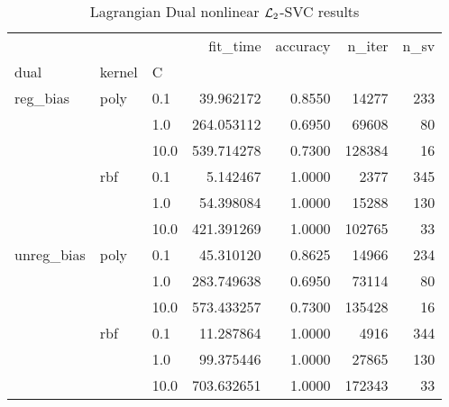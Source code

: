 \begin{table}[H]
\centering
\caption{Lagrangian Dual nonlinear $\protect \mathcal{L}_2$-SVC results}
\label{nonlinear_lagrangian_dual_l2_svc_cv_results}
\begin{tabular}{lllrrrr}
\toprule
           &     &      &    fit\_time &  accuracy &  n\_iter &  n\_sv \\
dual & kernel & C &             &           &         &       \\
\midrule
reg\_bias & poly & 0.1  &   39.962172 &    0.8550 &   14277 &   233 \\
           &     & 1.0  &  264.053112 &    0.6950 &   69608 &    80 \\
           &     & 10.0 &  539.714278 &    0.7300 &  128384 &    16 \\
           & rbf & 0.1  &    5.142467 &    1.0000 &    2377 &   345 \\
           &     & 1.0  &   54.398084 &    1.0000 &   15288 &   130 \\
           &     & 10.0 &  421.391269 &    1.0000 &  102765 &    33 \\
unreg\_bias & poly & 0.1  &   45.310120 &    0.8625 &   14966 &   234 \\
           &     & 1.0  &  283.749638 &    0.6950 &   73114 &    80 \\
           &     & 10.0 &  573.433257 &    0.7300 &  135428 &    16 \\
           & rbf & 0.1  &   11.287864 &    1.0000 &    4916 &   344 \\
           &     & 1.0  &   99.375446 &    1.0000 &   27865 &   130 \\
           &     & 10.0 &  703.632651 &    1.0000 &  172343 &    33 \\
\bottomrule
\end{tabular}
\end{table}
